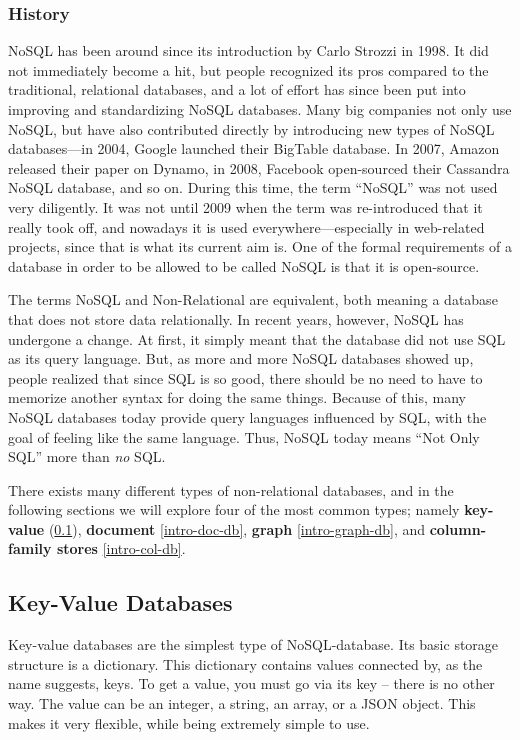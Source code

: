 \subsubsection{History}
\label{intro-history}
NoSQL has been around since its introduction by Carlo Strozzi in 1998. It did
not immediately become a hit, but people recognized its pros compared to
the traditional, relational databases, and a lot of effort has since been put
into improving and standardizing NoSQL databases. Many big companies not only
use NoSQL, but have also contributed directly by introducing new types of NoSQL
databases---in 2004, Google launched their BigTable database. In 2007, Amazon
released their paper on Dynamo, in 2008, Facebook open-sourced their Cassandra
NoSQL database, and so on. During this time, the term ``NoSQL'' was not used
very diligently. It was not until 2009 when the term was re-introduced that it
really took off, and nowadays it is used everywhere---especially in web-related
projects, since that is what its current aim is. One of the formal requirements
of a database in order to be allowed to be called NoSQL is that it is
open-source.

The terms NoSQL and Non-Relational are equivalent, both meaning a database that
does not store data relationally. In recent years, however, NoSQL has undergone
a change. At first, it simply meant that the database did not use SQL as its
query language. But, as more and more NoSQL databases showed up, people realized
that since SQL is so good, there should be no need to have to memorize another
syntax for doing the same things. Because of this, many NoSQL databases today
provide query languages influenced by SQL, with the goal of feeling like the
same language. Thus, NoSQL today means ``Not Only SQL'' more than \emph{no} SQL.

There exists many different types of non-relational databases, and in the
following sections we will explore four of the most common types; namely
\textbf{key-value} (\ref{intro-kv-db}), \textbf{document} \ref{intro-doc-db},
\textbf{graph} \ref{intro-graph-db}, and \textbf{column-family stores}
\ref{intro-col-db}.

\subsection{Key-Value Databases}
\label{intro-kv-db}
Key-value databases are the simplest type of NoSQL-database. Its basic storage
structure is a dictionary. This dictionary contains values connected by, as the
name suggests, keys. To get a value, you must go via its key -- there is no
other way. The value can be an integer, a string, an array, or a JSON object.
This makes it very flexible, while being extremely simple to use. 

